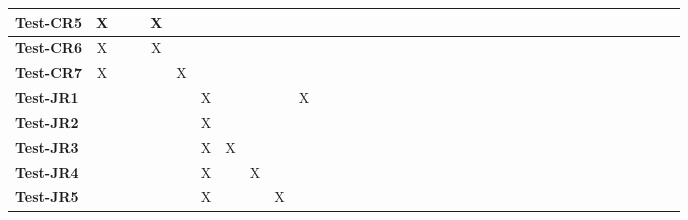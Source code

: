 \documentclass[12pt, titlepage]{article}
\begin{document}
\begin{landscape}
\begin{table}[H]
\begin{adjustwidth}{-0.1in}{-1in}
{\begin{tabular}{|c|c|c|c|c|c|c|c|c|c|c|c|c|c|c|c|c|l|l|l|l|l|l|l|l|l|l|l|l|l|l|l|l|l|l|l|l|}
\multicolumn{1}{|l|}{\textbf{Test-CR5}}   &             X&              &             &             X&             &              &              &             &              &              &             &             &              &              &              &                & & & & & & & & & & & & & & & & & & & &\\ \hline
\multicolumn{1}{|l|}{\textbf{Test-CR6}}   &              X&              &              &             X&              &             &             &             &              &              &              &             &              &              &              &                & & & & & & & & & & & & & & & & & & & &\\ \hline
\multicolumn{1}{|l|}{\textbf{Test-CR7}}   &             X&             &             &              &             X&              &             &             &              &              &             &             &              &             &              &                & & & & & & & & & & & & & & & & & & & &\\ \hline
\multicolumn{1}{|l|}{\textbf{Test-JR1}}   &             &             &             &              &             &              X&              &             &              &              X&              &              &              &              &              &                & & & & & & & & & & & & & & & & & & & &\\ \hline
\multicolumn{1}{|l|}{\textbf{Test-JR2}}   &             &              &             &             &             &              X&              &             &              &              &             &             &              &              &              &                & & & & & & & & & & & & & & & & & & & &\\ \hline
\multicolumn{1}{|l|}{\textbf{Test-JR3}}   &             &             &              &              &             &              X&              X&             &              &              &              &              &              &             &              &                & & & & & & & & & & & & & & & & & & & &\\ \hline
\multicolumn{1}{|l|}{\textbf{Test-JR4}}   &             &             &             &              &             &              X&              &             X&              &              &              &             &              &              &              &                & & & & & & & & & & & & & & & & & & & &\\ \hline
\multicolumn{1}{|l|}{\textbf{Test-JR5}}   &             &             &             &              &             &              X&              &             &              X&              &             &             &              &              &              &                & & & & & & & & & & & & & & & & & & & &\\ \hline

\end{tabular}}
\end{adjustwidth}
\end{table}
\end{landscape}
\end{document}
